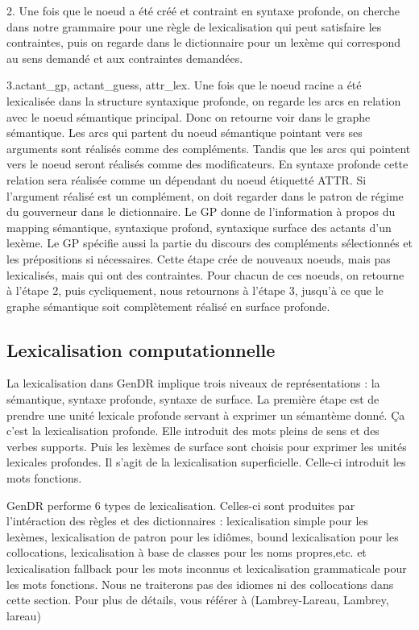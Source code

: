 2. Une fois que le noeud a été créé et contraint en syntaxe profonde, on cherche dans notre grammaire pour une règle de lexicalisation qui peut satisfaire les contraintes, puis on regarde dans le dictionnaire pour un lexème qui correspond au sens demandé et aux contraintes demandées.

3.actant\_gp, actant\_guess, attr\_lex. 
Une fois que le noeud racine a été lexicalisée dans la structure syntaxique profonde, on regarde les arcs en relation avec le noeud sémantique principal. Donc on retourne voir dans le graphe sémantique. Les arcs qui partent du noeud sémantique pointant vers ses arguments sont réalisés comme des compléments. Tandis que les arcs qui pointent vers le noeud seront réalisés comme des modificateurs. En syntaxe profonde cette relation sera réalisée comme un dépendant du noeud étiquetté ATTR. Si l'argument réalisé est un complément, on doit regarder dans le patron de régime du gouverneur dans le dictionnaire. Le GP donne de l'information à propos du mapping sémantique, syntaxique profond, syntaxique surface des actants d'un lexème. Le GP spécifie aussi la partie du discours des compléments sélectionnés et les prépositions si nécessaires. Cette étape crée de nouveaux noeuds, mais pas lexicalisés, mais qui ont des contraintes. Pour chacun de ces noeuds, on retourne à l'étape 2, puis cycliquement, nous retournons à l'étape 3,  jusqu'à ce que le graphe sémantique soit complètement réalisé en surface profonde.

\subsection{Lexicalisation computationnelle}

La lexicalisation dans GenDR implique trois niveaux de représentations : la sémantique, syntaxe profonde, syntaxe de surface. La première étape est de prendre une unité lexicale profonde servant à exprimer un sémantème donné. Ça c'est la lexicalisation profonde. Elle introduit des mots pleins de sens et des verbes supports. Puis les lexèmes de surface sont choisis pour exprimer les unités lexicales profondes. Il s'agit de la lexicalisation superficielle. Celle-ci introduit les mots fonctions.

GenDR performe 6 types de lexicalisation. Celles-ci sont produites par l'intéraction des règles et des dictionnaires : lexicalisation simple pour les lexèmes, lexicalisation de patron pour les idiômes, bound lexicalisation pour les collocations, lexicalisation à base de classes pour les noms propres,etc. et lexicalisation fallback pour les mots inconnus et lexicalisation grammaticale pour les mots fonctions.  Nous ne traiterons pas des idiomes ni des collocations dans cette section. Pour plus de détails, vous référer à (Lambrey-Lareau, Lambrey, lareau)

